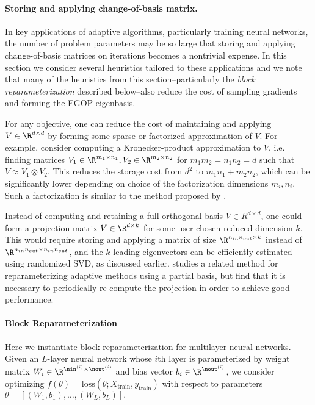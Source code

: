 \paragraph{Storing and applying change-of-basis matrix.}
In key applications of adaptive algorithms, particularly training neural networks, the number of problem parameters may be so large that storing and applying change-of-basis matrices on iterations becomes a nontrivial expense. In this section we consider several heuristics tailored to these applications and we note that many of the heuristics from this section--particularly the \emph{block reparameterization} described below--also reduce the cost of sampling gradients and forming the EGOP eigenbasis.

For any objective, one can reduce the cost of maintaining and applying $V \in \R^{d\times d}$ by forming some sparse or factorized approximation of $V$. For example, consider computing a Kronecker-product approximation to $V$, i.e. finding matrices $V_1 \in \R^{m_1\times n_1}, V_2 \in \R^{m_2 \times n_2}$ for $m_1 m_2 = n_1 n_2 = d$ such that $V \approx V_1\otimes V_2$. This reduces the storage cost from $d^2$ to $m_1 n_1 + m_2 n_2$, which can be significantly lower depending on choice of the factorization dimensions $m_i, n_i$. Such a factorization is similar to the method proposed by \citet{vyas2024soap}.

Instead of computing and retaining a full orthogonal basis $V\in R^{d\times d}$, one could form a projection matrix $V\in \R^{d\times k}$ for some user-chosen reduced dimension $k$. This would require storing and applying a matrix of size  $\R^{n_{in} n_{out} \times k}$ instead of $\R^{n_{in} n_{out} \times n_{in} n_{out}}$, and the $k$ leading eigenvectors can be efficiently estimated using randomized SVD, as discussed earlier. \citet{zhao2024galore} studies a related method for reparameterizing adaptive methods using a partial basis, but find that it is necessary to periodically re-compute the projection in order to achieve good performance.

\paragraph{Block Reparameterization} Here we instantiate block reparameterization for multilayer neural networks. Given an $L$-layer neural network whose $i$th layer is parameterized by weight matrix $W_i\in \R^{\nin^{(i)}\times \nout^{(i)}}$ and bias vector $b_i\in \R^{\nout^{(i)}}$, we consider optimizing $f(\theta) = \textrm{loss}(\theta; X_{\textrm{train}}, y_{\textrm{train}})$ with respect to parameters
$ \theta = [(W_1, b_1),\dots,(W_L, b_L)].$

